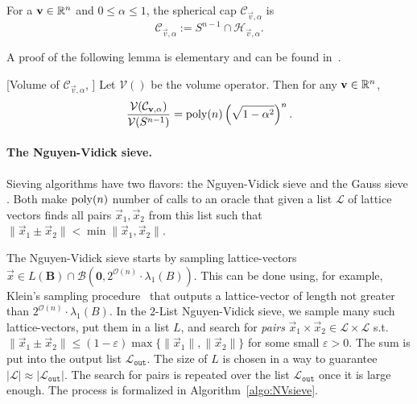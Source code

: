 \begin{definition}
	For a $\mathbf v \in \mathbb{R}^n$ and $0 \leq \alpha \leq 1$, the spherical cap $\mathcal{C}_{\vec v, \alpha}$ is
	\[
		\mathcal{C}_{\vec v, \alpha} := S^{n-1} \cap \mathcal{H}_{\vec v, \alpha}.
	\]
	
\end{definition}

A proof of the following lemma is elementary and can be found in~\cite[Lemma~A.3]{MV10}. 
\begin{lemma}{[Volume of $\mathcal{C}_{\vec v, \alpha}$, \cite[Lemma~A.3]{MV10}]} \label{lem:cap_vol}
	Let $\mathcal{V}()$ be the volume operator. Then for any $\mathbf v \in \mathbb{R}^n$,
	\[
		\frac{\mathcal{V} (	\mathcal{C}_{\mathbf v, \alpha} ) }{\mathcal{V}(S^{n-1})} = \operatorname{poly}(n) \left( \sqrt{1-\alpha^2} \right)^n.
	\]

\end{lemma}

\paragraph{The Nguyen-Vidick sieve.} Sieving algorithms have two flavors: the Nguyen-Vidick sieve \cite{NV08} and the Gauss sieve \cite{MicVou10}. Both make $\operatorname{poly}(n)$ number of calls to an oracle that given a list $\mathcal{L}$ of lattice vectors finds all pairs $\vec{x}_1, \vec{x}_2$ from  this list such that $\| \vec{x}_1 \pm \vec{x}_2 \| < \min{ \| \vec{x}_1, \vec{x}_2\| }$. 

The Nguyen-Vidick sieve starts by sampling lattice-vectors $\vec x \in L(\mathbf{B}) \cap \mathcal{B}(\mathbf{0}, 2^{\mathcal{O}(n)} \cdot \lambda_1(B))$. This can be done using, for example, Klein's sampling procedure~\cite{Klein00} that outputs a lattice-vector of length not greater than $2^{\mathcal{O}(n)} \cdot \lambda_1(B)$.  In the $2$-List Nguyen-Vidick sieve, we sample many such lattice-vectors, put them in a list $L$, and search for \emph{pairs} $\vec x_1 \times \vec x_2 \in \mathcal{L} \times \mathcal{L}$ s.t. $\| \vec x_1 \pm \vec x_2 \| \leq (1-\varepsilon) \max\{\| \vec x_1 \|, \| \vec x_2 \|\}$ for some small $\varepsilon>0$. The sum is put into the output list $\mathcal{L}_{\mathtt{out}}$. The size of $L$ is chosen in a way to guarantee $|{\mathcal{L}}| \approx |\mathcal{L}_{\mathtt{out}}|$. The search for pairs is repeated over the list $\mathcal{L}_{\mathtt{out}}$ once it is large enough.  The process is formalized in Algorithm~\ref{algo:NVsieve}.


